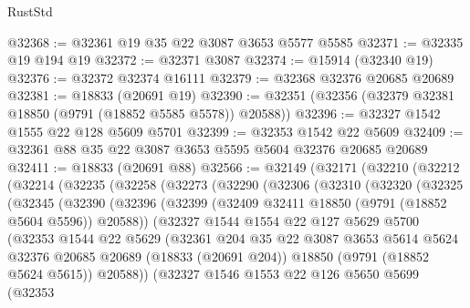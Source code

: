 \begin{lexlean}{RustStd}
\begin{coremodule}
@32368 := @32361 @19 @35 @22 @3087 @3653 @5577 @5585
@32371 := @32335 @19 @194 @19
@32372 := @32371 @3087
@32374 := @15914 (@32340 @19)
@32376 := @32372 @32374 @16111
@32379 := @32368 @32376 @20685 @20689
@32381 := @18833 (@20691 @19)
@32390 := @32351 (@32356 (@32379 @32381 @18850 (@9791 (@18852 @5585 @5578)) @20588))
@32396 := @32327 @1542 @1555 @22 @128 @5609 @5701
@32399 := @32353 @1542 @22 @5609
@32409 := @32361 @88 @35 @22 @3087 @3653 @5595 @5604 @32376 @20685 @20689
@32411 := @18833 (@20691 @88)
@32566 := @32149
    (@32171
      (@32210
        (@32212
          (@32214
            (@32235
              (@32258
                (@32273
                  (@32290
                    (@32306
                      (@32310
                        (@32320
                          (@32325
                            (@32345
                              (@32390
                                (@32396
                                  (@32399
                                    (@32409 @32411 @18850 (@9791 (@18852 @5604 @5596)) @20588))
                                  (@32327
                                    @1544
                                    @1554
                                    @22
                                    @127
                                    @5629
                                    @5700
                                    (@32353
                                      @1544
                                      @22
                                      @5629
                                      (@32361
                                        @204
                                        @35
                                        @22
                                        @3087
                                        @3653
                                        @5614
                                        @5624
                                        @32376
                                        @20685
                                        @20689
                                        (@18833 (@20691 @204))
                                        @18850
                                        (@9791 (@18852 @5624 @5615))
                                        @20588))
                                    (@32327
                                      @1546
                                      @1553
                                      @22
                                      @126
                                      @5650
                                      @5699
                                      (@32353

\end{coremodule}
\end{lexlean}
